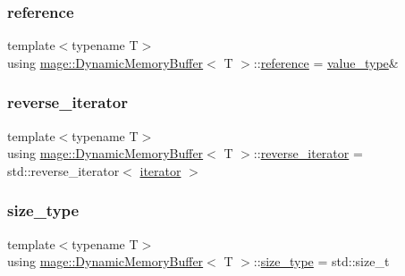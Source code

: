 \subsubsection{\texorpdfstring{reference}{reference}}
{\footnotesize\ttfamily template$<$typename T$>$ \\
using \mbox{\hyperlink{classmage_1_1_dynamic_memory_buffer}{mage\+::\+Dynamic\+Memory\+Buffer}}$<$ T $>$\+::\mbox{\hyperlink{classmage_1_1_dynamic_memory_buffer_a146681be5119c0329409436506334f05}{reference}} =  \mbox{\hyperlink{classmage_1_1_dynamic_memory_buffer_a951f47f06268fe148ed617d17cad6150}{value\+\_\+type}}\&}

\mbox{\label{classmage_1_1_dynamic_memory_buffer_ae87c651c2de7410a9af6ed723cea3811}} 
\subsubsection{\texorpdfstring{reverse\+\_\+iterator}{reverse\_iterator}}
{\footnotesize\ttfamily template$<$typename T$>$ \\
using \mbox{\hyperlink{classmage_1_1_dynamic_memory_buffer}{mage\+::\+Dynamic\+Memory\+Buffer}}$<$ T $>$\+::\mbox{\hyperlink{classmage_1_1_dynamic_memory_buffer_ae87c651c2de7410a9af6ed723cea3811}{reverse\+\_\+iterator}} =  std\+::reverse\+\_\+iterator$<$ \mbox{\hyperlink{classmage_1_1_dynamic_memory_buffer_aa5dca8e81d0c2a9e63d3a9bc61cce904}{iterator}} $>$}

\mbox{\label{classmage_1_1_dynamic_memory_buffer_a45d02825da2b18fd7c24965ed5f46a30}} 
\subsubsection{\texorpdfstring{size\+\_\+type}{size\_type}}
{\footnotesize\ttfamily template$<$typename T$>$ \\
using \mbox{\hyperlink{classmage_1_1_dynamic_memory_buffer}{mage\+::\+Dynamic\+Memory\+Buffer}}$<$ T $>$\+::\mbox{\hyperlink{classmage_1_1_dynamic_memory_buffer_a45d02825da2b18fd7c24965ed5f46a30}{size\+\_\+type}} =  std\+::size\+\_\+t}

